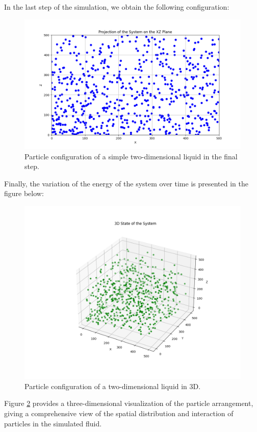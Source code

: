 \documentclass[a4paper,12pt]{article}
\begin{document}
In the last step of the simulation, we obtain the following configuration:
\begin{figure}[H]
    \centering
    \includegraphics[width=12cm]{images/03.png}
    \caption{Particle configuration of a simple two-dimensional liquid in the final step.}
    \label{fig:final}
\end{figure}

 Finally, the variation of the energy of the system over time is presented in the figure below:
\begin{figure}[H]
    \centering
    \includegraphics[width=13cm]{images/04.png}
    \caption{Particle configuration of a two-dimensional liquid in 3D.}
    \label{fig:3d}
\end{figure}

Figure \ref{fig:3d} provides a three-dimensional visualization of the particle arrangement, giving a comprehensive view of the spatial distribution and interaction of particles in the simulated fluid.
\end{document}
